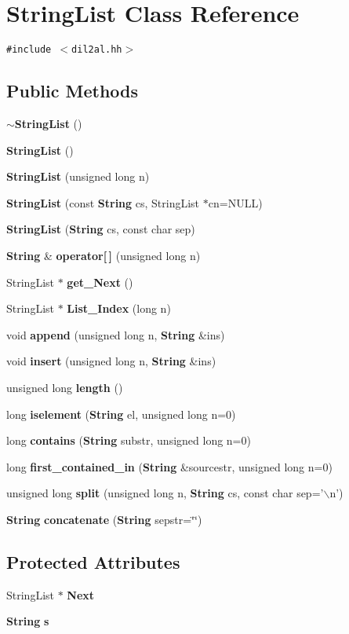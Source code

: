 \section{String\-List  Class Reference}
\label{classStringList}
{\tt \#include $<$dil2al.hh$>$}

\subsection*{Public Methods}
\begin{CompactItemize}
\item 
{\bf $\sim$String\-List} ()
\item 
{\bf String\-List} ()
\item 
{\bf String\-List} (unsigned long n)
\item 
{\bf String\-List} (const {\bf String} cs, String\-List $\ast$cn=NULL)
\item 
{\bf String\-List} ({\bf String} cs, const char sep)
\item 
{\bf String} \& {\bf operator[$\,$]} (unsigned long n)
\item 
String\-List $\ast$ {\bf get\_\-Next} ()
\item 
String\-List $\ast$ {\bf List\_\-Index} (long n)
\item 
void {\bf append} (unsigned long n, {\bf String} \&ins)
\item 
void {\bf insert} (unsigned long n, {\bf String} \&ins)
\item 
unsigned long {\bf length} ()
\item 
long {\bf iselement} ({\bf String} el, unsigned long n=0)
\item 
long {\bf contains} ({\bf String} substr, unsigned long n=0)
\item 
long {\bf first\_\-contained\_\-in} ({\bf String} \&sourcestr, unsigned long n=0)
\item 
unsigned long {\bf split} (unsigned long n, {\bf String} cs, const char sep='$\backslash$n')
\item 
{\bf String} {\bf concatenate} ({\bf String} sepstr=\char`\"{}\char`\"{})
\end{CompactItemize}
\subsection*{Protected Attributes}
\begin{CompactItemize}
\item 
String\-List $\ast$ {\bf Next}
\item 
{\bf String} {\bf s}
\end{CompactItemize}


